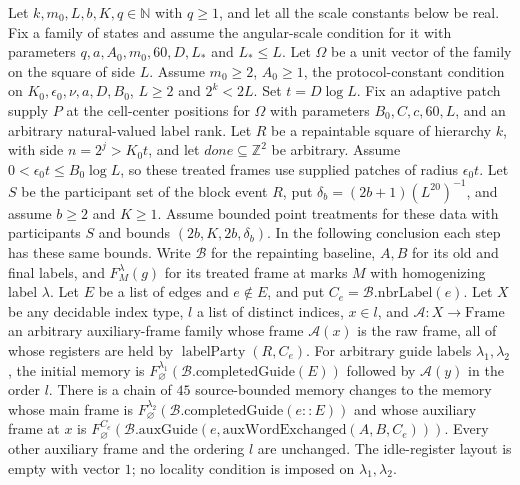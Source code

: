 \begin{lemma}
    \label{thm:peps_protocol_edge_construction_chain}
    \leanok
    Let $k,m_0,L,b,K,q\in\mathbb N$ with $q\ge1$, and let all the scale
    constants below be real. Fix a family of states and assume the angular-scale
    condition for it with parameters $q,a,A_0,m_0,60,D,L_*$ and $L_*\le L$. Let
    $\Omega$ be a unit vector of the family on the square of side $L$. Assume $m_0\ge2$,
    $A_0\ge1$, the protocol-constant condition on $K_0,\epsilon_0,\nu,a,D,B_0$,
    $L\ge2$ and $2^k<2L$. Set $t=D\log L$. Fix an adaptive patch supply
    $P$ at the cell-center positions for $\Omega$ with parameters
    $B_0,C,c,60,L$, and an arbitrary natural-valued label rank.
    Let $R$ be a repaintable square of hierarchy $k$, with side $n=2^j>K_0t$,
    and let $\mathit{done}\subseteq\mathbb Z^2$ be arbitrary. Assume
    $0<\epsilon_0t\le B_0\log L$, so these treated frames use supplied
    patches of radius $\epsilon_0t$.
    Let $S$ be the participant set of the block event $R$, put
    $\delta_b=(2b+1)(L^{20})^{-1}$, and assume $b\ge2$ and $K\ge1$.
    Assume bounded point treatments for these data with participants $S$ and
    bounds $(2b,K,2b,\delta_b)$. In the following conclusion each step has
    these same bounds. Write $\mathcal B$ for the repainting baseline,
    $A,B$ for its old and final labels, and $F_M^\lambda(g)$ for its treated
    frame at marks $M$ with homogenizing label $\lambda$.
    Let $E$ be a list of edges and $e\notin E$, and put
    $C_e=\mathcal B.\mathrm{nbrLabel}(e)$. Let $X$ be any decidable index
    type, $l$ a list of distinct indices, $x\in l$, and
    $\mathcal A:X\to\mathrm{Frame}$ an arbitrary auxiliary-frame family
    whose frame $\mathcal A(x)$ is the raw frame, all of whose registers are
    held by $\operatorname{labelParty}(R,C_e)$. For arbitrary guide labels
    $\lambda_1,\lambda_2$, the initial memory is
    $F_\varnothing^{\lambda_1}(\mathcal B.\mathrm{completedGuide}(E))$
    followed by $\mathcal A(y)$ in the order $l$.
    There is a chain of $45$ source-bounded memory changes to the memory whose
    main frame is
    $F_\varnothing^{\lambda_2}(\mathcal B.\mathrm{completedGuide}(e::E))$
    and whose auxiliary frame at $x$ is
    $F_\varnothing^{C_e}(\mathcal B.\mathrm{auxGuide}
        (e,\mathrm{auxWordExchanged}(A,B,C_e)))$.
    Every other auxiliary frame and the ordering $l$ are unchanged.
    The idle-register layout is empty with vector $1$; no locality condition
    is imposed on $\lambda_1,\lambda_2$.
\end{lemma}

